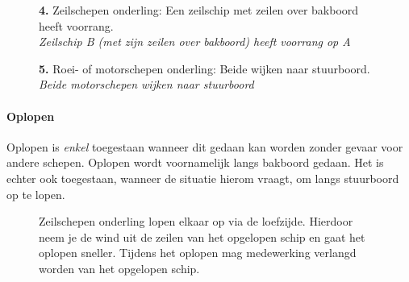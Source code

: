 \begin{figure}[H]
	\centering
	\begin{minipage}[t]{0.70\textwidth}
		\textbf{4.} Zeilschepen onderling: Een zeilschip met zeilen over bakboord heeft voorrang.\\
		\textit{Zeilschip B (met zijn zeilen over bakboord) heeft voorrang op A}
	\end{minipage}
	\hfill
	\begin{minipage}[t]{0.25\textwidth}
		\label{pic:tg4}
	\end{minipage}
	\hfill
\end{figure}
\vspace{-0.7cm}

\begin{figure}[H]
	\centering
	\begin{minipage}[t]{0.70\textwidth}
		\textbf{5.} Roei- of motorschepen onderling: Beide wijken naar stuurboord.\\
		\textit{Beide motorschepen wijken naar stuurboord}
	\end{minipage}
	\hfill
	\begin{minipage}[t]{0.25\textwidth}
		\label{pic:tg5}
	\end{minipage}
	\hfill
\end{figure}

\paragraph{Oplopen}
Oplopen is \textit{enkel} toegestaan wanneer dit gedaan kan worden zonder gevaar voor andere schepen. Oplopen wordt voornamelijk langs bakboord gedaan. Het is echter ook toegestaan, wanneer de situatie hierom vraagt, om langs stuurboord op te lopen.

\begin{figure}[H]
	\centering
	\begin{minipage}[t]{0.70\textwidth}
		Zeilschepen onderling lopen elkaar op via de loefzijde. Hierdoor neem je de wind uit de zeilen van het opgelopen schip en gaat het oplopen sneller. Tijdens het oplopen mag medewerking verlangd worden van het opgelopen schip.
	\end{minipage}
	\hfill
	\begin{minipage}[t]{0.25\textwidth}
		\label{pic:op}
	\end{minipage}
	\hfill
\end{figure}

